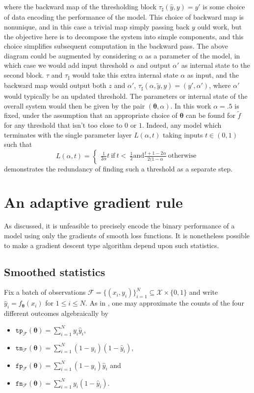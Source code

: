 \documentclass[10pt,a4paper]{article}
\begin{document}
where the backward map of the thresholding block $\tau_\sharp(\hat y,y)=y'$ is some choice of data encoding the performance of the model.
This choice of backward map is nonunique, and in this case a trivial map simply passing back $y$ ould work, but the objective here is to decompose the system into simple components, and this choice simplifies subsequent computation in the backward pass.
The above diagram could be augmented by considering $\alpha$ as a parameter of the model, in which case we would add input threshold $\alpha$ and output $\alpha'$ as internal state to the second block.
$\tau$ and $\tau_\sharp$ would take this extra internal state $\alpha$ as input, and the backward map would output both $z$ and $\alpha'$, $\tau_\sharp(\alpha,\tilde y,y)=(y',\alpha')$, where $\alpha'$ would typically be an updated threshold.
The parameters or internal state of the overall system would then be given by the pair $(\boldsymbol\theta,\alpha)$.
In this work $\alpha=.5$ is fixed, under the assumption that an appropriate choice of $\boldsymbol\theta$ can be found for $\tilde f$ for any threshold that isn't too close to $0$ or $1$.
Indeed, any model which terminates with the single parameter layer $L(\alpha,t)$ taking inputs $t\in(0,1)$ such that
$$
L(\alpha,t)=\begin{cases}\tfrac1{2\alpha}t~\text{if}~t<~\tfrac12\text{and}\tfrac{t+1-2\alpha}{2(1-\alpha}~\text{otherwise}\end{cases}
$$
demonstrates the redundancy of finding such a threshold as a separate step.
\section{An adaptive gradient rule}

As discussed, it is unfeasible to precisely encode the binary performance of a model using only the gradients of smooth loss functions.
It is nonetheless possible to make a gradient descent type algorithm depend upon such statistics.

\subsection{Smoothed statistics}

Fix a batch of observations $\mathcal F=\{(x_i,y_i)\}_{i=1}^N\subseteq\mathcal X\times\{0,1\}$ and write $\hat y_i=f_{\boldsymbol\theta}(x_i)$ for $1\leq i\leq N$.
As in \cite{lee2021surrogate}, one may  approximate the counts of the four different outcomes algebraically by
\begin{itemize}
  \item $\texttt{tp}_\mathcal F(\boldsymbol\theta)=\sum_{i=1}^N y_i\hat y_i$,
  \item $\texttt{tn}_\mathcal F(\boldsymbol\theta)=\sum_{i=1}^N(1-y_i)(1-\hat y_i)$,
  \item $\texttt{fp}_\mathcal F(\boldsymbol\theta)=\sum_{i=1}^N(1-y_i)\hat y_i$ and
  \item $\texttt{fn}_\mathcal F(\boldsymbol\theta)=\sum_{i=1}^Ny_i(1-\hat y_i)$.
\end{itemize}
\end{document}
